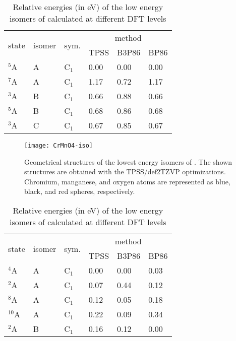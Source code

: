 	
\begin{table}[]
	\centering
	\caption{Relative energies (in eV) of the low energy isomers of  calculated at different DFT levels}
\begin{tabular}{@{}llllll@{}}
\toprule
\multirow{2}{*}{state} & \multirow{2}{*}{isomer} & \multirow{2}{*}{sym.} & \multicolumn{3}{c}{method} \\ \cmidrule(l){4-6} 
         &     &        & TPSS    & B3P86   & BP86   \\ \midrule
$^5$A    & A   & C$_1$  & 0.00    & 0.00    & 0.00   \\
$^7$A    & A   & C$_1$  & 1.17    & 0.72    & 1.17   \\
$^3$A    & B   & C$_1$  & 0.66    & 0.88    & 0.66   \\
$^5$A    & B   & C$_1$  & 0.68    & 0.86    & 0.68   \\
$^3$A    & C   & C$_1$  & 0.67    & 0.85    & 0.67   \\ \bottomrule
\end{tabular}
\label{tbl:CrMnO4}
\end{table}	



\begin{figure}
	\centering
	\texttt{[image: CrMnO4-iso]}
	\caption{Geometrical structures of the lowest energy isomers of . The shown structures are obtained with the TPSS/def2TZVP optimizations. Chromium, manganese, and oxygen atoms are represented as blue, black, and red spheres, respectively.}
	\label{figs:CrMnO4}
\end{figure}






\begin{table}[]
	\centering
	\caption{Relative energies (in eV) of the low energy isomers of  calculated at different DFT levels}
\begin{tabular}{@{}llllll@{}}
\toprule
\multirow{2}{*}{state} & \multirow{2}{*}{isomer} & \multirow{2}{*}{sym.} & \multicolumn{3}{c}{method} \\ \cmidrule(l){4-6} 
           &        &         & TPSS   & B3P86 & BP86   \\ \midrule
$^4$A      & A      & C$_1$   & 0.00   & 0.00  & 0.03 \\
$^2$A      & A      & C$_1$   & 0.07   & 0.44  & 0.12 \\
$^8$A      & A      & C$_1$   & 0.12   & 0.05  & 0.18 \\
$^{10}$A   & A      & C$_1$   & 0.22   & 0.09  & 0.34 \\
$^2$A      & B      & C$_1$   & 0.16   & 0.12  & 0.00 \\ \bottomrule
\end{tabular}
\label{tbl:CrMn2O5}
\end{table}	




